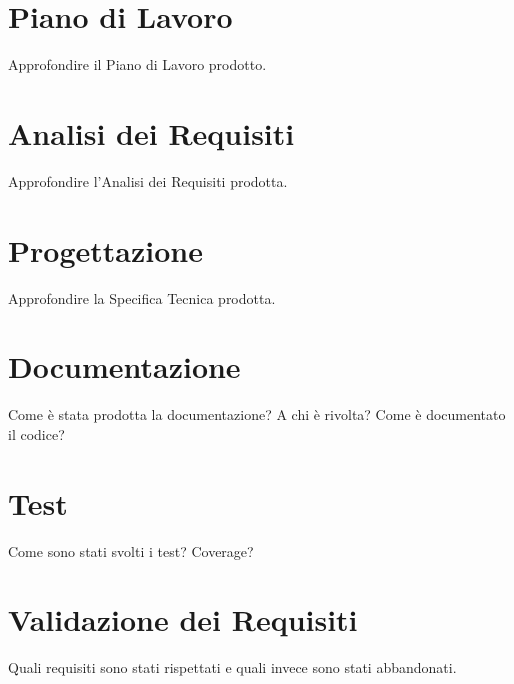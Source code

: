 \section{Piano di Lavoro}

Approfondire il Piano di Lavoro prodotto.

\section{Analisi dei Requisiti}

Approfondire l'Analisi dei Requisiti prodotta.

\section{Progettazione}

Approfondire la Specifica Tecnica prodotta.


\section{Documentazione}

Come è stata prodotta la documentazione? A chi è rivolta? Come è documentato il codice?

\section{Test}

Come sono stati svolti i test? Coverage?


\section{Validazione dei Requisiti}

Quali requisiti sono stati rispettati e quali invece sono stati abbandonati.